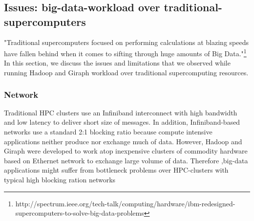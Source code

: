 \documentclass[conference]{IEEEtran}
\begin{document}

\subsection {Issues: big-data-workload over traditional-supercomputers}
"Traditional supercomputers focused on performing calculations at blazing speeds have fallen behind when it comes to sifting through huge amounts of Big Data."\footnote{http://spectrum.ieee.org/tech-talk/computing/hardware/ibm-redesigned-supercomputers-to-solve-big-data-problems}\\ 
In this section, we discuss the issues and limitations that we observed while running Hadoop and Giraph workload over traditional supercomputing resources. 
\subsubsection {Network}
Traditional HPC clusters use an Infiniband interconnect with high bandwidth and low latency to deliver short size of messages. In addition, Infiniband-based networks use a standard 2:1 blocking ratio because compute intensive applications neither produce nor exchange much of data.
However, Hadoop and Giraph were developed to work atop inexpensive clusters of commodity hardware based on Ethernet network to exchange large volume of data.
Therefore ,big-data applications might suffer from bottleneck problems over HPC-clusters with typical high blocking ration networks
\end{document}
